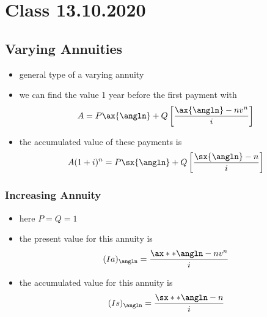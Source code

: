 \documentclass[../00_main.tex]{subfiles}
\begin{document}
\section{Class 13.10.2020}

\subsection{Varying Annuities}

\begin{itemize}
    \item general type of a varying annuity
\begin{center}
\end{center}
\item we can find the value 1 year before the first payment with
    \begin{equation}\nonumber
        A = P\ax{\angln} + Q \left[ \frac{\ax{\angln} - nv^n}{i} \right]
    \end{equation}
\item the accumulated value of these payments is
    \begin{equation}\nonumber
        A(1+i)^n = P\sx{\angln} + Q \left[ \frac{\sx{\angln} - n}{i} \right]
    \end{equation}
\end{itemize}

\subsubsection{Increasing Annuity}
\begin{itemize}
    \item here $P=Q=1$
    \item the present value for this annuity is 
    \begin{equation}\nonumber
        (Ia)_{\angln} = \frac{\ax**{\angln} - nv^n}{i}
    \end{equation}
    \item the accumulated value for this annuity is 
    \begin{equation}\nonumber
        (Is)_{\angln} = \frac{\sx**{\angln} - n}{i}
    \end{equation}
\end{itemize}
\end{document}

